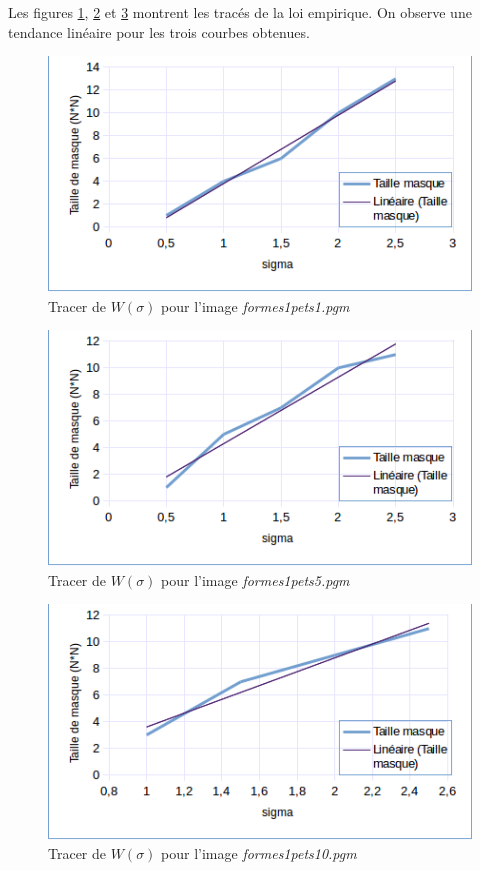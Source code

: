 \documentclass[paper=a4, fontsize=11pt]{scrartcl} %
\begin{document}
Les figures \ref{w(sig)pets1}, \ref{w(sig)pets5} et \ref{w(sig)pets10} montrent les tracés de la loi empirique.
On observe une tendance linéaire pour les trois courbes obtenues.


\begin{figure}[h!]
\centering
\caption{Tracer de $W(\sigma)$ pour l'image \textit{formes1pets1.pgm}}
\label{w(sig)pets1}
\includegraphics[scale=0.8]{images/rapport/courbes/img1W.png} 
\end{figure}

\begin{figure}[h!]
\centering
\caption{Tracer de $W(\sigma)$ pour l'image \textit{formes1pets5.pgm}}
\label{w(sig)pets5}
\includegraphics[scale=0.8]{images/rapport/courbes/img5W.png} 
\end{figure}

\begin{figure}[h!]
\centering
\caption{Tracer de $W(\sigma)$ pour l'image \textit{formes1pets10.pgm}}
\label{w(sig)pets10}
\includegraphics[scale=0.8]{images/rapport/courbes/img10W.png} 
\end{figure}
\end{document}
